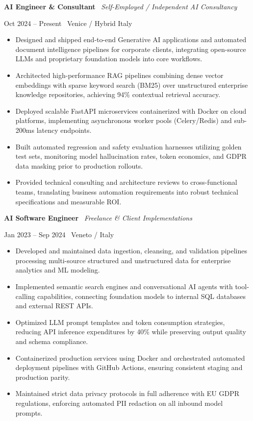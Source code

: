 \documentclass[a4paper,10pt]{article}
\newcommand{\role}[4]{%
  \vspace{2pt}\noindent
  \begin{minipage}[t]{0.70\textwidth}\raggedright\textbf{#1} \textbullet\ \textit{#3}\end{minipage}%
  \hfill
  \begin{minipage}[t]{0.28\textwidth}\raggedleft\footnotesize\color{gray}#2 \textbullet\ #4\end{minipage}%
  \vspace{1pt}%
}
\begin{document}
\role{AI Engineer \& Consultant}{Oct 2024 -- Present}{Self-Employed / Independent AI Consultancy}{Venice / Hybrid Italy}
\begin{itemize}
  \item Designed and shipped end-to-end Generative AI applications and automated document intelligence pipelines for corporate clients, integrating open-source LLMs and proprietary foundation models into core workflows.
  \item Architected high-performance RAG pipelines combining dense vector embeddings with sparse keyword search (BM25) over unstructured enterprise knowledge repositories, achieving 94\% contextual retrieval accuracy.
  \item Deployed scalable FastAPI microservices containerized with Docker on cloud platforms, implementing asynchronous worker pools (Celery/Redis) and sub-200ms latency endpoints.
  \item Built automated regression and safety evaluation harnesses utilizing golden test sets, monitoring model hallucination rates, token economics, and GDPR data masking prior to production rollouts.
  \item Provided technical consulting and architecture reviews to cross-functional teams, translating business automation requirements into robust technical specifications and measurable ROI.
\end{itemize}

\role{AI Software Engineer}{Jan 2023 -- Sep 2024}{Freelance \& Client Implementations}{Veneto / Italy}
\begin{itemize}
  \item Developed and maintained data ingestion, cleansing, and validation pipelines processing multi-source structured and unstructured data for enterprise analytics and ML modeling.
  \item Implemented semantic search engines and conversational AI agents with tool-calling capabilities, connecting foundation models to internal SQL databases and external REST APIs.
  \item Optimized LLM prompt templates and token consumption strategies, reducing API inference expenditures by 40\% while preserving output quality and schema compliance.
  \item Containerized production services using Docker and orchestrated automated deployment pipelines with GitHub Actions, ensuring consistent staging and production parity.
  \item Maintained strict data privacy protocols in full adherence with EU GDPR regulations, enforcing automated PII redaction on all inbound model prompts.
\end{itemize}
\end{document}
